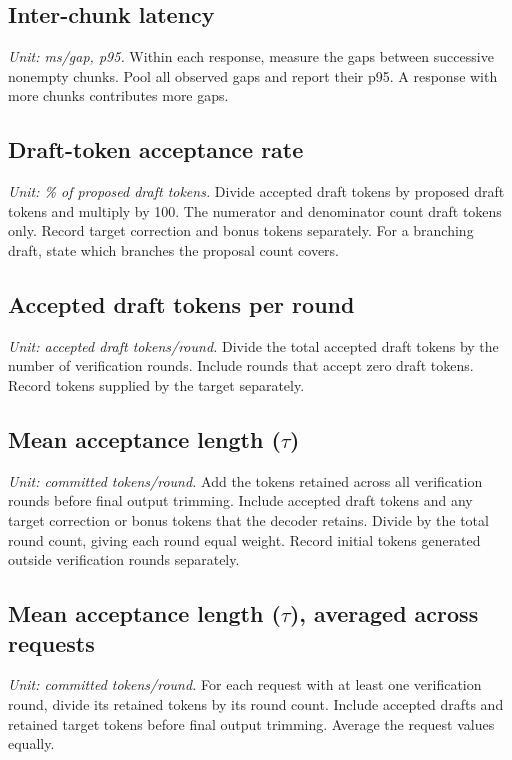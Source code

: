 \documentclass[conference,onecolumn]{IEEEtran}
\begin{document}
\subsection{Inter-chunk latency}

\textit{Unit: ms/gap, p95.} Within each response, measure the gaps between successive nonempty chunks. Pool all observed gaps and report their p95. A response with more chunks contributes more gaps.

\subsection{Draft-token acceptance rate}

\textit{Unit: \% of proposed draft tokens.} Divide accepted draft tokens by proposed draft tokens and multiply by 100. The numerator and denominator count draft tokens only. Record target correction and bonus tokens separately. For a branching draft, state which branches the proposal count covers.

\subsection{Accepted draft tokens per round}

\textit{Unit: accepted draft tokens/round.} Divide the total accepted draft tokens by the number of verification rounds. Include rounds that accept zero draft tokens. Record tokens supplied by the target separately.

\subsection{Mean acceptance length (\(\tau\))}

\textit{Unit: committed tokens/round.} Add the tokens retained across all verification rounds before final output trimming. Include accepted draft tokens and any target correction or bonus tokens that the decoder retains. Divide by the total round count, giving each round equal weight. Record initial tokens generated outside verification rounds separately.

\subsection{Mean acceptance length (\(\tau\)), averaged across requests}

\textit{Unit: committed tokens/round.} For each request with at least one verification round, divide its retained tokens by its round count. Include accepted drafts and retained target tokens before final output trimming. Average the request values equally.
\end{document}
